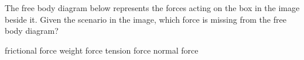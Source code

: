 \documentclass[answers]{exam}
\begin{document}
\begin{questions}

\question %
The free body diagram below represents the forces acting on the box in the image beside it. Given the scenario in the image, which force is missing from the free body diagram?

\begin{center}
\end{center}

\begin{randomizechoices}[norandomize]
    \correctchoice frictional force
    \choice weight force
    \choice tension force
    \choice normal force    
\end{randomizechoices}








\end{questions}
\end{document}
